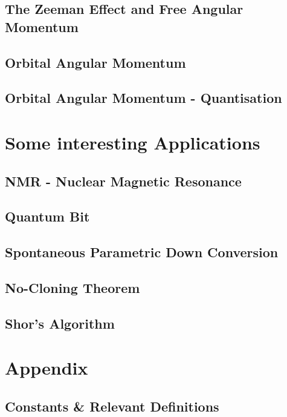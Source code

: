 \documentclass[colorlinks,11pt,a4paper,normalphoto,withhyper,ragged2e]{altareport}
\begin{document}
	
	\subsection{The Zeeman Effect and Free Angular Momentum}
	
	
	\subsection{Orbital Angular Momentum}
	
	
	\subsection{Orbital Angular Momentum - Quantisation}
	
	
	\pagebreak
	

\section{Some interesting Applications}
	
	\subsection{NMR - Nuclear Magnetic Resonance}
	
	\subsection{Quantum Bit}
	
	\subsection{Spontaneous Parametric Down Conversion}
	
	\subsection{No-Cloning Theorem}
	
	\subsection{Shor's Algorithm}
	
	
	
		
\section{Appendix}
	
	\subsection{Constants \& Relevant Definitions}
		
\end{document}
